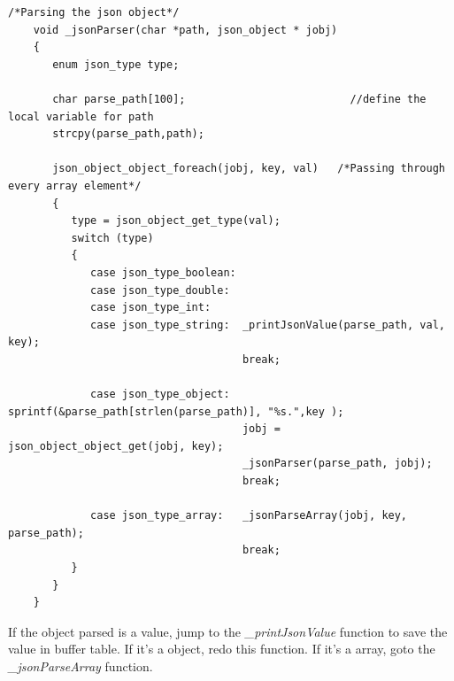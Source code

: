 \begin{lstlisting}[mathescape]
    /*Parsing the json object*/
    void _jsonParser(char *path, json_object * jobj)
    {
       enum json_type type;

       char parse_path[100];                          //define the local variable for path
       strcpy(parse_path,path);

       json_object_object_foreach(jobj, key, val)   /*Passing through every array element*/
       {
          type = json_object_get_type(val);
          switch (type)
          {
             case json_type_boolean:
             case json_type_double:
             case json_type_int:
             case json_type_string:  _printJsonValue(parse_path, val, key);
                                     break;

             case json_type_object:  sprintf(&parse_path[strlen(parse_path)], "%s.",key );
                                     jobj = json_object_object_get(jobj, key);
                                     _jsonParser(parse_path, jobj);
                                     break;

             case json_type_array:   _jsonParseArray(jobj, key, parse_path);
                                     break;
          }
       }
    }
\end{lstlisting}

If the object parsed is a value, jump to the \textit{\_printJsonValue} function to save the value in buffer table. If it's a object, redo this function. If it's a array, goto the \textit{\_jsonParseArray} function.

